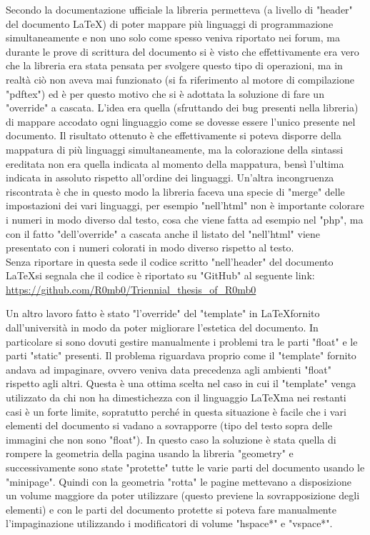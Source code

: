 Secondo la documentazione ufficiale la libreria permetteva (a livello di "header" del documento \LaTeX) di poter mappare più linguaggi di programmazione simultaneamente e non uno solo come spesso veniva riportato nei forum, ma durante le prove di scrittura del documento si è visto che effettivamente era vero che la libreria era stata pensata per svolgere questo tipo di operazioni, ma in realtà ciò non aveva mai funzionato (si fa riferimento al motore di compilazione "pdftex") ed è per questo motivo che si è adottata la soluzione di fare un "override" a cascata. L'idea era quella (sfruttando dei bug presenti nella libreria) di mappare accodato ogni linguaggio come se dovesse essere l'unico presente nel documento. Il risultato ottenuto è che effettivamente si poteva disporre della mappatura di più linguaggi simultaneamente, ma la colorazione della sintassi ereditata non era quella indicata al momento della mappatura, bensì l'ultima indicata in assoluto rispetto all'ordine dei linguaggi. Un'altra incongruenza riscontrata è che in questo modo la libreria faceva una specie di "merge" delle impostazioni dei vari linguaggi, per esempio "nell'html" non è importante colorare i numeri in modo diverso dal testo, cosa che viene fatta ad esempio nel "php", ma con il fatto "dell'override" a cascata anche il listato del "nell'html" viene presentato con i numeri colorati in modo diverso rispetto al testo.\\
Senza riportare in questa sede il codice scritto "nell'header" del documento \LaTeX si segnala che il codice è riportato su "GitHub" al seguente link: \url{https://github.com/R0mb0/Triennial_thesis_of_R0mb0}

Un altro lavoro fatto è stato "l'override" del "template" in \LaTeX fornito dall'università in modo da poter migliorare l'estetica del documento. In particolare si sono dovuti gestire manualmente i problemi tra le parti "float" e le parti "static" presenti. Il problema riguardava proprio come il "template" fornito andava ad impaginare, ovvero veniva data precedenza agli ambienti "float" rispetto agli altri. Questa è una ottima scelta nel caso in cui il "template" venga utilizzato da chi non ha dimestichezza con il linguaggio \LaTeX ma nei restanti casi è un forte limite, sopratutto perché in questa situazione è facile che i vari elementi del documento si vadano a sovrapporre  (tipo del testo sopra delle immagini che non sono "float"). In questo caso la soluzione è stata quella di rompere la geometria della pagina usando la libreria "geometry" e successivamente sono state "protette" tutte le varie parti del documento usando le "minipage". Quindi con la geometria "rotta" le pagine mettevano a disposizione un volume maggiore da poter utilizzare (questo previene la sovrapposizione degli elementi) e con le parti del documento protette si poteva fare manualmente l'impaginazione utilizzando i modificatori di volume "hspace*" e "vspace*". 